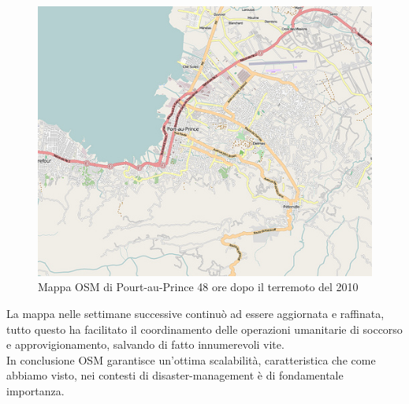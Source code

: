  \begin{figure}[H]
	\centering
	\includegraphics[scale=0.6]{OpenStreetMap/haiti_dopo.jpg}
	\caption{Mappa OSM di Pourt-au-Prince 48 ore dopo il terremoto del 2010}
	\label{fig: haiti_day2}
\end{figure}

La mappa nelle settimane successive continuò ad essere aggiornata e raffinata, tutto questo ha facilitato il coordinamento delle operazioni umanitarie di soccorso e approvigionamento, salvando di fatto innumerevoli vite.\\
In conclusione OSM garantisce un'ottima scalabilità, caratteristica che come abbiamo visto, nei contesti di disaster-management è di fondamentale importanza. 